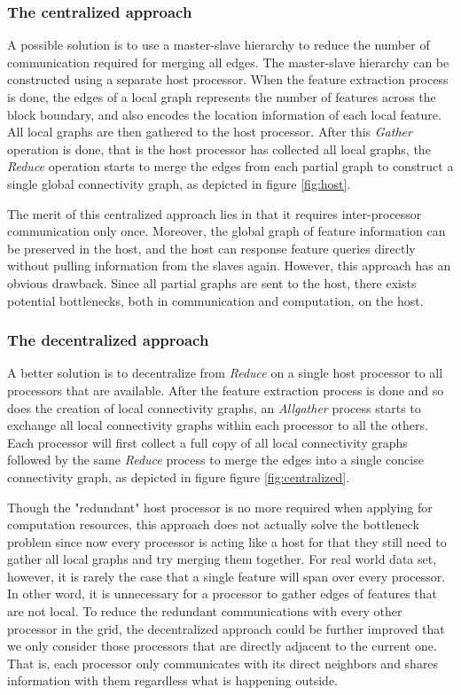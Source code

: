 \documentclass[10pt, conference, compsocconf]{IEEEtran}
\begin{document}
\subsubsection{The centralized approach}

A possible solution is to use a master-slave hierarchy to reduce the number of communication required for merging all edges. The master-slave hierarchy can be constructed using a separate host processor. When the feature extraction process is done, the edges of a local graph represents the number of features across the block boundary, and also encodes the location information of each local feature. All local graphs are then gathered to the host processor. After this \emph{Gather} operation is done, that is the host processor has collected all local graphs, the \emph{Reduce} operation starts to merge the edges from each partial graph to construct a single global connectivity graph, as depicted in figure \ref{fig:host}.

The merit of this centralized approach lies in that it requires inter-processor communication only once. Moreover, the global graph of feature information can be preserved in the host, and the host can response feature queries directly without pulling information from the slaves again. However, this approach has an obvious drawback. Since all partial graphs are sent to the host, there exists potential bottlenecks, both in communication and computation, on the host.  

\subsubsection{The decentralized approach}

A better solution is to decentralize from \emph{Reduce} on a single host processor to all processors that are available. After the feature extraction process is done and so does the creation of local connectivity graphs, an \emph{Allgather} process starts to exchange all local connectivity graphs within each processor to all the others. Each processor will first collect a full copy of all local connectivity graphs followed by the same \emph{Reduce} process to merge the edges into a single concise connectivity graph, as depicted in figure figure \ref{fig:centralized}.

Though the "redundant" host processor is no more required when applying for computation resources, this approach does not actually solve the bottleneck problem since now every processor is acting like a host for that they still need to gather all local graphs and try merging them together. For real world data set, however, it is rarely the case that a single feature will span over every processor. In other word, it is unnecessary for a processor to gather edges of features that are not local. To reduce the redundant communications with every other processor in the grid, the decentralized approach could be further improved that we only consider those processors that are directly adjacent to the current one. That is, each processor only communicates with its direct neighbors and shares information with them regardless what is happening outside.
\end{document}
